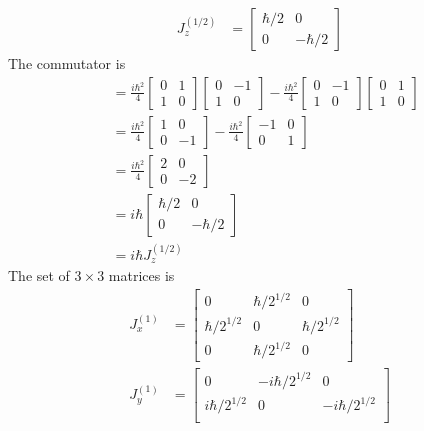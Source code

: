 \documentclass[../principles-of-quantum-mechanics.tex]{subfiles}
\begin{document}
\begin{questions}
\begin{solution}
\begin{align*}
				J_z^{(1/2)} &= \begin{bmatrix}\hbar / 2 & 0 \\ 0 & -\hbar/2\end{bmatrix}
			\end{align*}
			The commutator is
			\begin{align*}
				[J_x^{(1/2)}, J_y^{(1/2)}] &= \frac{i\hbar^2}{4}\begin{bmatrix}0 & 1 \\ 1 & 0\end{bmatrix}\begin{bmatrix}0 & -1 \\ 1 & 0\end{bmatrix} - \frac{i\hbar^2}{4}\begin{bmatrix}0 & -1 \\ 1 & 0\end{bmatrix}\begin{bmatrix}0 & 1\\1 & 0\end{bmatrix} \\
				&= \frac{i\hbar^2}{4}\begin{bmatrix}1 & 0 \\ 0 & -1\end{bmatrix} - \frac{i\hbar^2}{4}\begin{bmatrix}-1 & 0 \\ 0 & 1\end{bmatrix} \\
				&= \frac{i\hbar^2}{4}\begin{bmatrix}2 & 0 \\ 0 & -2\end{bmatrix} \\
				&= i\hbar\begin{bmatrix}\hbar/2 & 0 \\ 0 & -\hbar/2\end{bmatrix} \\
				&= i\hbar J_z^{(1/2)}
			\end{align*}
			The set of $3\times3$ matrices is
			\begin{align*}
				J_x^{(1)} &= \begin{bmatrix}0 & \hbar/2^{1/2} & 0 \\
				\hbar/2^{1/2} & 0 & \hbar/2^{1/2} \\
				0 & \hbar/2^{1/2} & 0\end{bmatrix} \\
				J_y^{(1)} &= \begin{bmatrix}0 & -i\hbar/2^{1/2} & 0 \\ i\hbar/2^{1/2} & 0 & -i\hbar/2^{1/2} \\

\end{bmatrix}
\end{align*}
\end{solution}
\end{questions}
\end{document}
